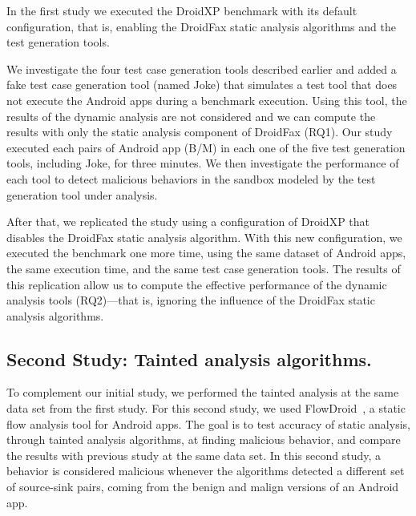 In the first study we executed the DroidXP benchmark with its
default configuration, that is, enabling the DroidFax
static analysis algorithms and the test generation tools.

We investigate the four test case generation tools described earlier and added a fake test
case generation tool (named Joke) that simulates a test tool that does not execute
the Android apps during a benchmark execution. Using this tool, the results
of the dynamic analysis are not considered and we can compute the results with
only the static analysis component of DroidFax (RQ1). Our study executed each pairs of
Android app (B/M) in each one of the five test generation tools, including Joke,
for three minutes. We then investigate the performance of each tool to detect
malicious behaviors in the sandbox modeled by the test generation tool
under analysis.



After that, we replicated the study using a configuration of DroidXP that
disables the DroidFax static analysis algorithm. With this new configuration,
we executed the benchmark one more time, using the same dataset of Android
apps, the same execution time, and the same test case generation tools.
The results of this replication allow us to compute the effective performance
of the dynamic analysis tools (RQ2)---that is, ignoring the influence of the
DroidFax static analysis algorithms.

\subsection{Second Study: Tainted analysis algorithms.}

To complement our initial study, we performed the tainted analysis at the same
data set from the first study. For this second study, we used
FlowDroid~\cite{10.1145/2666356.2594299}, a static flow analysis tool for Android apps.
The goal is to test accuracy of static analysis, through tainted analysis algorithms, at finding malicious behavior, and compare the results with previous study at the same data set.
In this second study, a behavior is considered malicious whenever the algorithms
detected a different set of source-sink pairs, coming from the benign and malign
versions of an Android app. 

